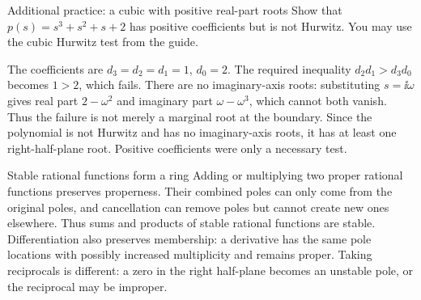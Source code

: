 \begin{question}{Additional practice: a cubic with positive real-part roots}
Show that $p(s)=s^3+s^2+s+2$ has positive coefficients but is not Hurwitz. You may use the cubic Hurwitz test from the guide.
\end{question}
\begin{answer}
The coefficients are $d_3=d_2=d_1=1$, $d_0=2$. The required inequality $d_2d_1>d_3d_0$ becomes $1>2$, which fails. There are no imaginary-axis roots: substituting $s=\ii\omega$ gives real part $2-\omega^2$ and imaginary part $\omega-\omega^3$, which cannot both vanish. Thus the failure is not merely a marginal root at the boundary. Since the polynomial is not Hurwitz and has no imaginary-axis roots, it has at least one right-half-plane root. Positive coefficients were only a necessary test.
\end{answer}
\begin{concept}{Stable rational functions form a ring}
Adding or multiplying two proper rational functions preserves properness. Their combined poles can only come from the original poles, and cancellation can remove poles but cannot create new ones elsewhere. Thus sums and products of stable rational functions are stable. Differentiation also preserves membership: a derivative has the same pole locations with possibly increased multiplicity and remains proper. Taking reciprocals is different: a zero in the right half-plane becomes an unstable pole, or the reciprocal may be improper.
\end{concept}


